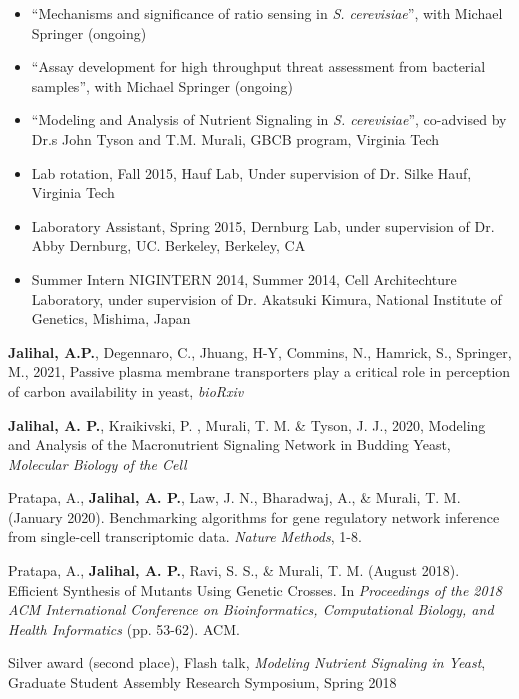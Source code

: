 \documentclass[10pt,a4paper,ragged2e]{altacv}
\begin{document}
\begin{itemize}
\item ``Mechanisms and significance of ratio sensing in \textit{S. cerevisiae}'', with Michael Springer (ongoing)
\item ``Assay development for high throughput threat assessment from bacterial samples'', with Michael Springer (ongoing)
\item ``Modeling and Analysis of Nutrient Signaling in \textit{S. cerevisiae}'', co-advised by Dr.s John Tyson and T.M. Murali, GBCB program, Virginia Tech
  \item Lab rotation, Fall 2015, Hauf Lab, Under supervision of Dr. Silke Hauf, Virginia Tech
  \item Laboratory Assistant, Spring 2015, Dernburg Lab, under supervision of Dr. Abby Dernburg, UC. Berkeley, Berkeley, CA
  \item Summer Intern  NIGINTERN 2014, Summer 2014, Cell Architechture Laboratory, under supervision of Dr. Akatsuki Kimura, National Institute of Genetics, Mishima, Japan
\end{itemize}

\begin{etaremune}
\item \textbf{Jalihal, A.P.}, Degennaro, C., Jhuang, H-Y, Commins, N., Hamrick, S., Springer, M., 2021, Passive plasma membrane transporters play a critical role in
perception of carbon availability in yeast, \textit{bioRxiv}
\item \textbf{Jalihal, A. P.}, Kraikivski, P. , Murali, T. M. \& Tyson, J. J., 2020, Modeling and Analysis of the Macronutrient Signaling Network in Budding Yeast, \textit{Molecular Biology of the Cell}
\item Pratapa, A., \textbf{Jalihal, A. P.}, Law, J. N., Bharadwaj, A., \& Murali, T. M. (January 2020). Benchmarking algorithms for gene regulatory network inference from single-cell transcriptomic data. \textit{Nature Methods}, 1-8.
\item Pratapa, A., \textbf{Jalihal, A. P.}, Ravi, S. S., \& Murali, T. M. (August 2018). Efficient Synthesis of Mutants Using Genetic Crosses. In \textit{Proceedings of the 2018 ACM International Conference on Bioinformatics, Computational Biology, and Health Informatics} (pp. 53-62). ACM.
\end{etaremune}


Silver award (second place), Flash talk, \textit{Modeling Nutrient Signaling in Yeast}, Graduate Student Assembly Research Symposium, Spring 2018
\end{document}
